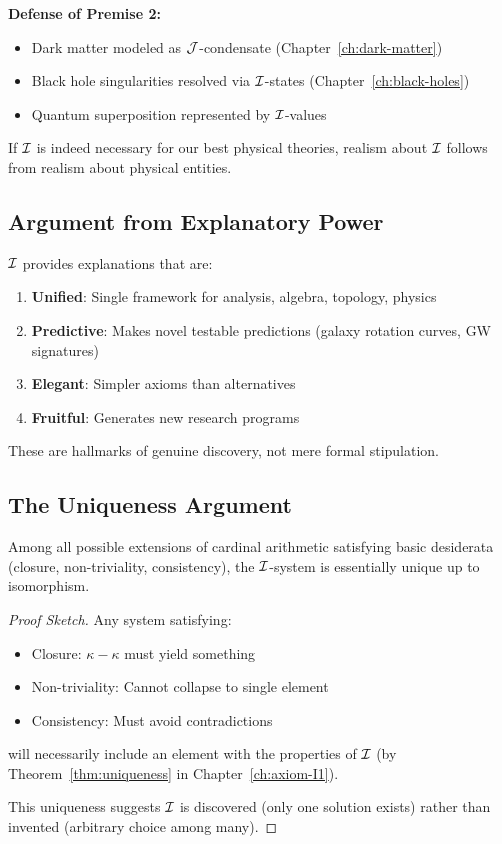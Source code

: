 \textbf{Defense of Premise 2:}
\begin{itemize}
    \item Dark matter modeled as $\mathcal{J}$-condensate (Chapter~\ref{ch:dark-matter})
    \item Black hole singularities resolved via $\mathcal{I}$-states (Chapter~\ref{ch:black-holes})
    \item Quantum superposition represented by $\mathcal{I}$-values
\end{itemize}

If $\mathcal{I}$ is indeed necessary for our best physical theories, realism about $\mathcal{I}$ follows from realism about physical entities.

\subsection{Argument from Explanatory Power}

\begin{proposition}
$\mathcal{I}$ provides explanations that are:
\begin{enumerate}
    \item \textbf{Unified}: Single framework for analysis, algebra, topology, physics
    \item \textbf{Predictive}: Makes novel testable predictions (galaxy rotation curves, GW signatures)
    \item \textbf{Elegant}: Simpler axioms than alternatives
    \item \textbf{Fruitful}: Generates new research programs
\end{enumerate}
\end{proposition}

These are hallmarks of genuine discovery, not mere formal stipulation.

\subsection{The Uniqueness Argument}

\begin{theorem}
Among all possible extensions of cardinal arithmetic satisfying basic desiderata (closure, non-triviality, consistency), the $\mathcal{I}$-system is essentially unique up to isomorphism.
\end{theorem}

\begin{proof}[Proof Sketch]
Any system satisfying:
\begin{itemize}
    \item Closure: $\kappa - \kappa$ must yield something
    \item Non-triviality: Cannot collapse to single element
    \item Consistency: Must avoid contradictions
\end{itemize}
will necessarily include an element with the properties of $\mathcal{I}$ (by Theorem~\ref{thm:uniqueness} in Chapter~\ref{ch:axiom-I1}).

This uniqueness suggests $\mathcal{I}$ is discovered (only one solution exists) rather than invented (arbitrary choice among many).
\end{proof}

